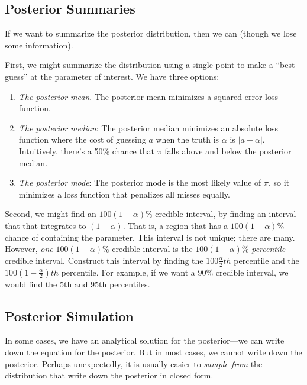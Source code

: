 \documentclass[
]{book}
\providecommand{\tightlist}{%
  \setlength{\itemsep}{0pt}\setlength{\parskip}{0pt}}
\begin{document}
\hypertarget{posterior-summaries}{%
\subsection{Posterior Summaries}\label{posterior-summaries}}

If we want to summarize the posterior distribution, then we can (though we lose some information).

First, we might summarize the distribution using a single point to make a ``best guess'' at the parameter of interest. We have three options:

\begin{enumerate}
\def\labelenumi{\arabic{enumi}.}
\tightlist
\item
  \emph{The posterior mean}. The posterior mean minimizes a squared-error loss function.
\item
  \emph{The posterior median}: The posterior median minimizes an absolute loss function where the cost of guessing \(a\) when the truth is \(\alpha\) is \(|a - \alpha|\). Intuitively, there's a 50\% chance that \(\pi\) falls above and below the posterior median.
\item
  \emph{The posterior mode}: The posterior mode is the most likely value of \(\pi\), so it minimizes a loss function that penalizes all misses equally.
\end{enumerate}

Second, we might find an \(100(1 - \alpha)\%\) credible interval, by finding an interval that that integrates to \((1 - \alpha)\). That is, a region that has a \(100(1 - \alpha)\%\) chance of containing the parameter. This interval is not unique; there are many. However, \emph{one} \(100(1 - \alpha)\%\) credible interval is the \(100(1 - \alpha)\%\) \emph{percentile} credible interval. Construct this interval by finding the \(100\frac{\alpha}{2}th\) percentile and the \(100(1 - \frac{\alpha}{2})th\) percentile. For example, if we want a 90\% credible interval, we would find the 5th and 95th percentiles.

\hypertarget{posterior-simulation}{%
\subsection{Posterior Simulation}\label{posterior-simulation}}

In some cases, we have an analytical solution for the posterior---we can write down the equation for the posterior. But in most cases, we cannot write down the posterior. Perhaps unexpectedly, it is usually easier to \emph{sample from} the distribution that write down the posterior in closed form.
\end{document}
